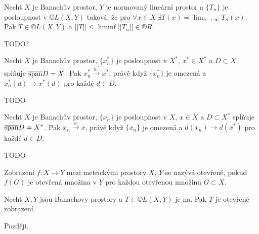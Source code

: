 \documentclass[12pt]{article}					%
\begin{document}
\begin{dusledek}
	Nechť $X$ je Banachův prostor, $Y$ je normovaný lineární prostor a $\{T_n\}$ je posloupnost v $©L(X, Y)$ taková, že pro $\forall x \in X\ \exists T(x) = \lim_{n \rightarrow ∞} T_n(x)$. Pak $T \in ©L(X, Y)$ a $||T|| ≤ \liminf ||T_n|| \in ®R$.

	\begin{dukazin}
		TODO?
	\end{dukazin}
\end{dusledek}

\begin{tvrzeni}
	Nechť $X$ je Banachův prostor, $\{x^*_n\}$ je posloupnost v $X^*$, $x^* \in X^*$ a $D \subset X$ splňuje $\overline{\operatorname{span}} D = X$. Pak $x^*_n \overset{w^*}{\rightarrow} x^*$, právě když $\{x^*_n\}$ je omezená a $x^*_n(d) \rightarrow x^*(d)$ pro každé $d \in D$.

	\begin{dukazin}
		TODO
	\end{dukazin}
\end{tvrzeni}

\begin{tvrzeni}
	Nechť $X$ je Banachův prostor, $\{x_n\}$ je posloupnost v $X$, $x \in X$ a $D \subset X^*$ splňuje $\overline{\operatorname{span}} D = X^*$. Pak $x_n \overset{w}{\rightarrow} x$, právě když $\{x_n\}$ je omezená a $d(x_n) \rightarrow d(x^*)$ pro každé $d \in D$.

	\begin{dukazin}
		TODO
	\end{dukazin}
\end{tvrzeni}

\begin{definice}
	Zobrazení $f: X \rightarrow Y$ mezi metrickými prostory $X$, $Y$ se nazývá otevřené, pokud $f(G)$ je otevřená množina v $Y$ pro každou otevřenou množinu $G \subset X$.
\end{definice}

\begin{veta}
	Nechť $X, Y$ jsou Banachovy prostory a $T \in ©L(X, Y)$ je na. Pak $T$ je otevřené zobrazení.

	\begin{dukazin}
		Později.
	\end{dukazin}
\end{veta}
\end{document}

